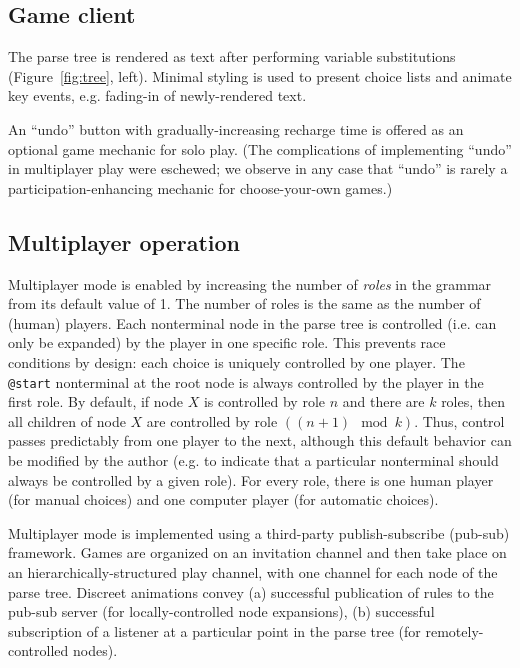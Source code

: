 \documentclass{acm_proc_article-sp}
\begin{document}
\subsection{Game client}

The parse tree is rendered as text after performing variable substitutions (Figure~\ref{fig:tree}, left).
Minimal styling is used to present choice lists and animate key events,
e.g. fading-in of newly-rendered text.

An ``undo'' button with gradually-increasing recharge time is offered as an optional game mechanic for solo play.
(The complications of implementing ``undo'' in multiplayer play were eschewed;
 we observe in any case that ``undo'' is rarely a participation-enhancing mechanic for choose-your-own games.)

\subsection{Multiplayer operation}

Multiplayer mode is enabled by increasing the number of {\em roles} in the grammar from its default value of 1.
The number of roles is the same as the number of (human) players.
Each nonterminal node in the parse tree is controlled (i.e. can only be expanded) by the player in one specific role.
This prevents race conditions by design: each choice is uniquely controlled by one player.
The {\tt @start} nonterminal at the root node is always controlled by the player in the first role.
By default, if node $X$ is controlled by role $n$ and there are $k$ roles,
then all children of node $X$ are controlled by role $((n+1)\mod k)$.
Thus, control passes predictably from one player to the next,
although this default behavior can be modified by the author (e.g. to indicate that a particular nonterminal
should always be controlled by a given role).
For every role, there is one human player (for manual choices)
and one computer player (for automatic choices).

Multiplayer mode is implemented using a third-party publish-subscribe (pub-sub) framework.
Games are organized on an invitation channel and then take place on an hierarchically-structured
play channel, with one channel for each node of the parse tree.
Discreet animations convey
 (a) successful publication of rules to the pub-sub server (for locally-controlled node expansions),
 (b) successful subscription of a listener at a particular point in the parse tree (for remotely-controlled nodes).
\end{document}
